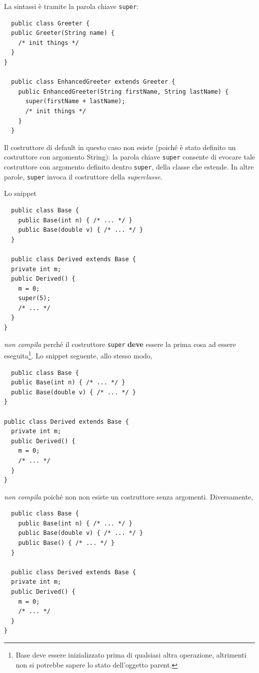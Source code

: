 \documentclass[\fontsizeclass,twocolumn]{\classname}
\theoremstyle{definition}
\theoremstyle{definition}
\begin{document}
La sintassi è tramite la parola chiave \texttt{super}:

\begin{lstlisting}
  public class Greeter {
  public Greeter(String name) {
    /* init things */
  }
}

  public class EnhancedGreeter extends Greeter {
    public EnhancedGreeter(String firstName, String lastName) {
      super(firstName + lastName);
      /* init things */
    }
  }
\end{lstlisting}

Il costruttore di default in questo caso non esiste (poiché è stato definito un
costruttore con argomento String): la parola chiave \texttt{super} consente di
evocare tale costruttore con argomento definito dentro \texttt{super}, della
classe che estende. In altre parole, \texttt{super} invoca il costruttore della
\emph{superclasse}.

Lo snippet

\begin{lstlisting}
  public class Base {
    public Base(int n) { /* ... */ }
    public Base(double v) { /* ... */ }
  }

  public class Derived extends Base {
  private int m;
  public Derived() {
    m = 0;
    super(5);
    /* ... */
  }
}
\end{lstlisting}

\emph{non compila} perché il costruttore \texttt{super} \textbf{deve} essere la
prima cosa ad essere eseguita\footnote{Base deve essere inizializzato prima di
qualsiasi altra operazione, altrimenti non si potrebbe sapere lo stato
dell'oggetto parent.}. Lo snippet seguente, allo stesso modo,

\begin{lstlisting}
  public class Base {
  public Base(int n) { /* ... */ }
  public Base(double v) { /* ... */ }
}

public class Derived extends Base {
  private int m;
  public Derived() {
    m = 0;
    /* ... */
  }
}
\end{lstlisting}

\emph{non compila} poiché non non esiste un costruttore senza argomenti.
Diversamente,

\begin{lstlisting}
  public class Base {
    public Base(int n) { /* ... */ }
    public Base(double v) { /* ... */ }
    public Base() { /* ... */ }
  }

  public class Derived extends Base {
  private int m;
  public Derived() {
    m = 0;
    /* ... */
  }
}
\end{lstlisting}
\end{document}
